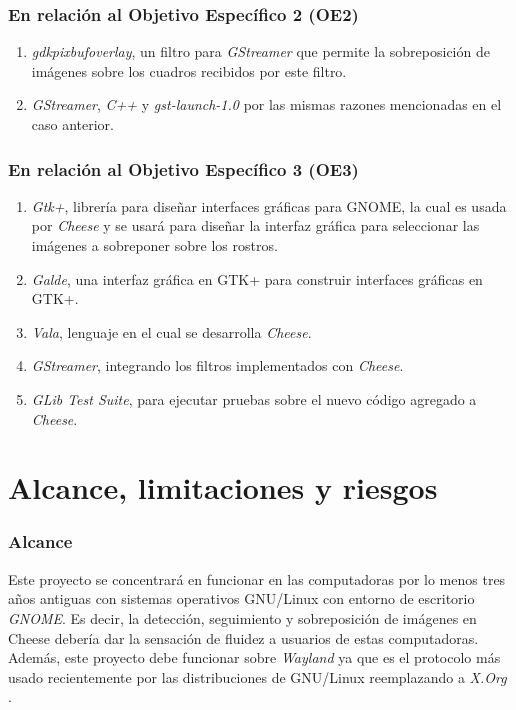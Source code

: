 \documentclass[a4paper,openright,12pt]{report}
\begin{document}
\subsubsection{En relación al Objetivo Específico 2 (OE2)}
\begin{enumerate}
    \item \textit{gdkpixbufoverlay}, un filtro para \textit{GStreamer} que permite la
        sobreposición de imágenes sobre los cuadros recibidos por este filtro.
    \item \textit{GStreamer}, \textit{C++} y \textit{gst-launch-1.0}
        por las mismas razones mencionadas en el caso anterior.
\end{enumerate}

\subsubsection{En relación al Objetivo Específico 3 (OE3)}
\begin{enumerate}
    \item \textit{Gtk+}, librería para diseñar interfaces gráficas para GNOME,
        la cual es usada por \textit{Cheese} y se usará para diseñar la
        interfaz gráfica para seleccionar las imágenes a sobreponer sobre
        los rostros.
    \item \textit{Galde}, una interfaz gráfica en GTK+ para construir interfaces
        gráficas en GTK+.
    \item \textit{Vala}, lenguaje en el cual se desarrolla \textit{Cheese}.
    \item \textit{GStreamer}, integrando los filtros implementados con
        \textit{Cheese}.
    \item \textit{GLib Test Suite}, para ejecutar pruebas sobre el nuevo código
        agregado a \textit{Cheese}.
\end{enumerate}



\section{Alcance, limitaciones y riesgos}

\subsubsection{Alcance}
    Este proyecto se concentrará en funcionar en las computadoras por lo menos
    tres años antiguas con sistemas operativos GNU/Linux con entorno de
    escritorio \textit{GNOME}. Es decir, la detección, seguimiento y
    sobreposición de imágenes en Cheese debería dar la sensación de fluidez a
    usuarios de estas computadoras. Además, este proyecto debe funcionar sobre
    \textit{Wayland} ya que es el protocolo más usado recientemente por las
    distribuciones de GNU/Linux reemplazando a \textit{X.Org}
    \cite{LinuxMagazineWaylandStrong}.
\end{document}
